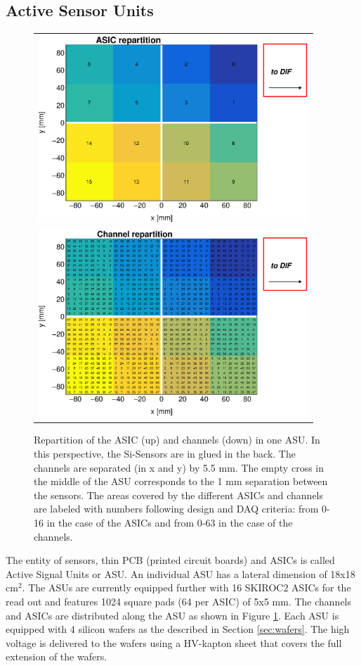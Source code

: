 \documentclass[a4paper,11pt]{article}
\begin{document}
\subsection{Active Sensor Units}
\label{sec:ASU}

\begin{figure}[!t]
  \centering
  \begin{tabular}{l}
    \includegraphics[width=4in]{figs/ASU_geometry1.eps}  \\
    \includegraphics[width=4in]{figs/ASU_geometry2.eps}  \\
  \end{tabular}
  \caption{Repartition of the ASIC (up) and channels (down) in one ASU. In this perspective, the Si-Sensors are in glued in the back.
    The channels are separated (in x and y) by 5.5 mm.
    The empty cross in the middle of the ASU corresponds to the 1 mm separation between the sensors.
    The areas covered by the different ASICs and channels
    are labeled with numbers following design and DAQ criteria: from 0-16 in the case of the ASICs and from 0-63 in the case of the channels.
  }
\label{ASU}
\end{figure}

The entity
of sensors, thin PCB (printed circuit boards) and ASICs is called Active Signal Units or ASU.
An individual ASU has a lateral dimension of 18x18 cm$^{2}$.
The ASUs are currently equipped
further with 16 SKIROC2 ASICs for the read out and features 1024 square pads (64 per ASIC) of 5x5 mm.
The channels and ASICs are distributed along the ASU as shown in Figure \ref{ASU}. Each ASU is equipped with 4 silicon wafers as the described in Section \ref{sec:wafers}.
The high voltage is delivered to the wafers using a HV-kapton sheet that covers the full extension of the wafers.
\end{document}
